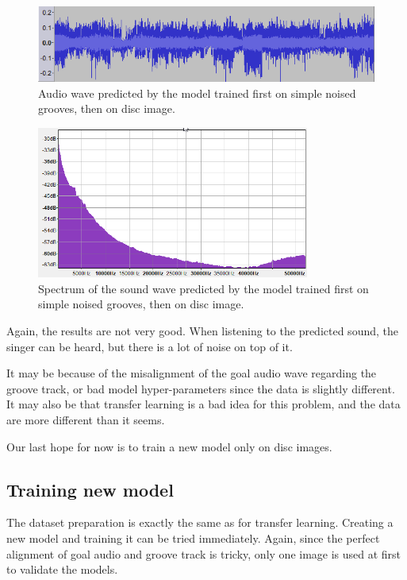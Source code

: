 \documentclass[12pt, twoside]{article}
\begin{document}
\begin{figure}
	\centering
	\includegraphics[width=1.0\textwidth]{../images/m5001_pred.png}
	\caption{Audio wave predicted by the model trained first on simple noised grooves, then on disc image.}
	\label{m5001_pred}
\end{figure}

\begin{figure}
	\centering
	\includegraphics[width=0.8\textwidth]{../images/m5001_spectrum.png}
	\caption{Spectrum of the sound wave predicted by the model trained first on simple noised grooves, then on disc image.}
	\label{m5001_spectrum}
\end{figure}

Again, the results are not very good. When listening to the predicted sound, the singer can be heard, but there is a lot of noise on top of it.

It may be because of the misalignment of the goal audio wave regarding the groove track, or bad model hyper-parameters since the data is slightly different. It may also be that transfer learning is a bad idea for this problem, and the data are more different than it seems.

Our last hope for now is to train a new model only on disc images.
\subsection{Training new model}
The dataset preparation is exactly the same as for transfer learning. Creating a new model and training it can be tried immediately. Again, since the perfect alignment of goal audio and groove track is tricky, only one image is used at first to validate the models.
\end{document}
